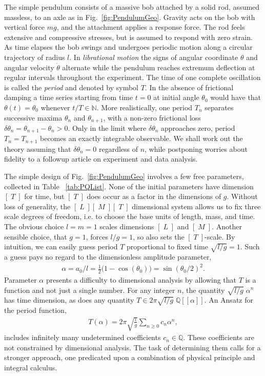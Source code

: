 \documentclass[nofootinbib,preprint]{revtex4-1}
\begin{document}
The simple pendulum consists of a massive bob attached by a solid rod, assumed 
massless, to an axle as in Fig.~\ref{fig:PendulumGeo}. Gravity acts on the bob with 
vertical force $mg$, and the attachment applies a response force. The rod feels 
extensive and compressive stresses, but is assumed to respond with zero strain.
As time elapses the bob swings and undergoes periodic motion 
along a circular trajectory of radius $l$. In \textit{librational motion}
the signs of angular coordinate $\theta$ and angular velocity $\dot{\theta}$ alternate 
while the pendulum reaches extremum deflection at regular intervals throughout the 
experiment. The time of one complete oscillation is called the \textit{period} and 
denoted by symbol $T$. In the absence of frictional damping a time series starting
from time $t=0$ at initial angle $\theta_0$ would have that $\theta(t)=\theta_0$ whenever 
$t/T\in \mathbb{N}$. More realistically, one period $T_n$ separates successive 
maxima $\theta_n$ and $\theta_{n+1}$, with a non-zero frictional loss $\delta\theta_n = 
\theta_{n+1}-\theta_n>0$. Only in the limit where $\delta\theta_n$ approaches zero, 
period $T_n=T_{n+1}$ becomes an exactly integrable observable. We shall work out the theory
assuming that $\delta\theta_n = 0$ regardless of $n$, while postponing worries about
fidelity to a followup article on experiment and data analysis.
\pagebreak

The simple design of Fig.~\ref{fig:PendulumGeo} involves a few free 
parameters, collected in Table ~\ref{tab:PQList}. None of the initial parameters 
have dimension $[\;T\;]$ for time, but $[\;T\;]$ does occur as a factor in the 
dimensions of $g$. Without loss of generality, the $[\;L\;][\;M\;][\;T\;]$ dimensional 
system allows us to fix three scale degrees of freedom, i.e. to choose the base units
of length, mass, and time. The obvious choice $l=m=1$ scales dimensions $[\;L\;]$ and 
$[\;M\;]$. Another sensible choice, that $g=1$, forces $l/g=1$, so also sets the 
$[\;T\;]$-scale. By intuition, we can easily guess period $T$ proportional 
to fixed time $\sqrt{l/g}=1$. Such a guess pays no regard to the dimensionless 
amplitude parameter,
\begin{eqnarray}
\alpha = a_0/l = \frac{1}{2}\big( 1 - \cos(\theta_0) \big) =  \sin(\theta_0 / 2)^2. \nonumber
\end{eqnarray}
Parameter $\alpha$ presents a difficulty to dimensional analysis by allowing that $T$ 
is a function and not just a single number. For any integer $n$, the quantity 
$\sqrt{l/g}\;\alpha^n$ has time dimension, as does any quantity 
$T \in 2\pi \sqrt{l/g}\;\mathbb{Q}[\![\alpha]\!]$. An Ansatz for the period function, 
\begin{eqnarray}
T(\alpha)=2\pi\sqrt{\frac{l}{g}}\sum_{n\ge 0}c_n \alpha^n, \nonumber
\end{eqnarray} 
includes infinitely many undetermined coefficients $c_n \in \mathbb{Q}$. These coefficients 
are not constrained by dimensional analysis. The task of determining them calls for a 
stronger approach, one predicated upon a combination of physical principle and
integral calculus.
\end{document}
